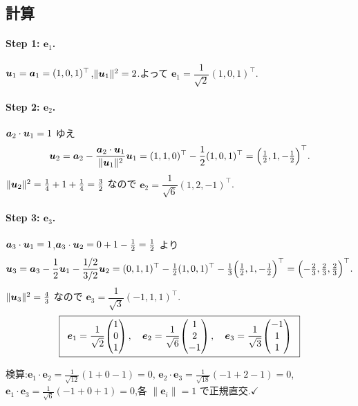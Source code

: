 \documentclass[11pt,a4paper]{article}
\begin{document}
\subsection*{計算}

\paragraph{Step 1: $\bm{e}_1$.}
$\bm{u}_1=\bm{a}_1=(1,0,1)^\top$,$\|\bm{u}_1\|^2=2$.よって
$\bm{e}_1=\dfrac{1}{\sqrt2}(1,0,1)^\top$.

\paragraph{Step 2: $\bm{e}_2$.}
$\bm{a}_2\cdot\bm{u}_1=1$ ゆえ
\[
\bm{u}_2=\bm{a}_2-\frac{\bm{a}_2\cdot\bm{u}_1}{\|\bm{u}_1\|^2}\bm{u}_1
=(1,1,0)^\top-\frac12(1,0,1)^\top=\Bigl(\tfrac12,1,-\tfrac12\Bigr)^\top.
\]
$\|\bm{u}_2\|^2=\tfrac14+1+\tfrac14=\tfrac32$ なので
$\bm{e}_2=\dfrac{1}{\sqrt6}(1,2,-1)^\top$.

\paragraph{Step 3: $\bm{e}_3$.}
$\bm{a}_3\cdot\bm{u}_1=1$,$\bm{a}_3\cdot\bm{u}_2=0+1-\tfrac12=\tfrac12$ より
\[
\bm{u}_3=\bm{a}_3-\frac{1}{2}\bm{u}_1-\frac{1/2}{3/2}\bm{u}_2
=(0,1,1)^\top-\tfrac12(1,0,1)^\top-\tfrac13\Bigl(\tfrac12,1,-\tfrac12\Bigr)^\top
=\Bigl(-\tfrac23,\tfrac23,\tfrac23\Bigr)^\top.
\]
$\|\bm{u}_3\|^2=\tfrac43$ なので $\bm{e}_3=\dfrac{1}{\sqrt3}(-1,1,1)^\top$.
\[
\ans{\
\bm{e}_1=\frac{1}{\sqrt2}\!\begin{pmatrix}1\\0\\1\end{pmatrix},\quad
\bm{e}_2=\frac{1}{\sqrt6}\!\begin{pmatrix}1\\2\\-1\end{pmatrix},\quad
\bm{e}_3=\frac{1}{\sqrt3}\!\begin{pmatrix}-1\\1\\1\end{pmatrix}\ }
\]

検算:$\bm{e}_1\cdot\bm{e}_2=\frac{1}{\sqrt{12}}(1+0-1)=0$,
$\bm{e}_2\cdot\bm{e}_3=\frac{1}{\sqrt{18}}(-1+2-1)=0$,
$\bm{e}_1\cdot\bm{e}_3=\frac{1}{\sqrt6}(-1+0+1)=0$,各 $\|\bm{e}_i\|=1$ で正規直交.$\checkmark$

\end{document}
